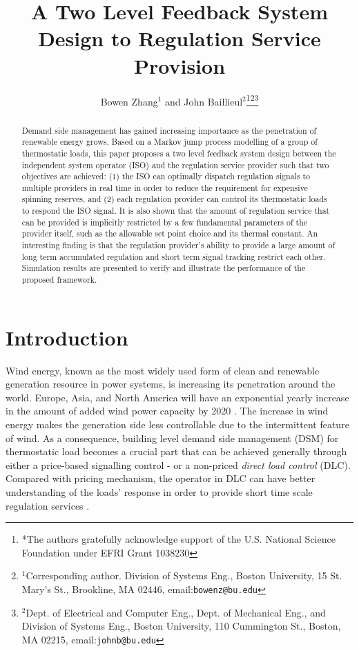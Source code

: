 \documentclass[journal]{IEEEtran}
\title{\LARGE \bf A Two Level Feedback System Design to Regulation Service Provision}
\author{Bowen Zhang$^{1}$ and John Baillieul$^{2}$\thanks{*The authors gratefully acknowledge support of the U.S. National Science Foundation under EFRI Grant 1038230}\thanks{$^{1}$Corresponding author. Division of Systems Eng., Boston University, 15 St. Mary’s St., Brookline, MA 02446, email:{\tt\small bowenz@bu.edu}}\thanks{$^{2}$Dept. of Electrical and Computer Eng., Dept. of Mechanical Eng., and Division of Systems Eng., Boston University, 110 Cummington St., Boston, MA 02215, email:{\tt\small johnb@bu.edu}}}
\begin{document}
\maketitle
\thispagestyle{empty}
\pagestyle{empty}
\begin{abstract}
Demand side management has gained increasing importance as the penetration of renewable energy grows. Based on a Markov jump process modelling of a group of thermostatic loads, this paper proposes a two level feedback system design between the independent system operator (ISO) and the regulation service provider such that two objectives are achieved: (1) the ISO can optimally dispatch regulation signals to multiple providers in real time in order to reduce the requirement for expensive spinning reserves, and (2) each regulation provider can control its thermostatic loads to respond the ISO signal. It is also shown that the amount of regulation service that can be provided is implicitly restricted by a few fundamental parameters of the provider itself, such as the allowable set point choice and its thermal constant. An interesting finding is that the regulation provider's ability to provide a large amount of long term accumulated regulation and short term signal tracking restrict each other. Simulation results are presented to verify and illustrate the performance of the proposed framework. 
\end{abstract}

\section{Introduction}
\label{introduction}

Wind energy, known as the most widely used form of clean and renewable generation resource in power systems, is increasing its penetration around the world. Europe, Asia, and North America will have an exponential yearly increase in the amount of added wind power capacity by 2020 \cite{emerge}. The increase in wind energy makes the generation side less controllable due to the intermittent feature of wind. As a consequence, building level demand side management (DSM) for thermostatic load becomes a crucial part that can be achieved generally through either a price-based signalling control \cite{caram1}-\cite{albadi} or a non-priced \textit{direct load control} (DLC). Compared with pricing mechanism, the operator in DLC can have better understanding of the loads' response in order to provide short time scale regulation services \cite{duncan1}.
\end{document}

